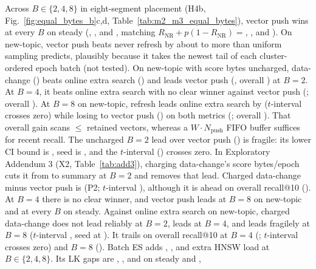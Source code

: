 Across $B \in \{2, 4, 8\}$ in eight-segment placement (H4b, Fig.~\ref{fig:equal_bytes_b}c,d, Table~\ref{tab:m2_m3_equal_bytes}), vector push wins at every $B$ on steady (\RNumMThreePVRecentBTwoSteady{}, \RNumMThreePVRecentBFourSteady{}, and \RNumMThreePVRecentBEightSteady{}, matching $R_{\text{NR}} + p(1 - R_{\text{NR}}) = {}$\RNumMThreePVPredRecentBTwoSteady{}, \RNumMThreePVPredRecentBFourSteady{}, and \RNumMThreePVPredRecentBEightSteady{}). On new-topic, vector push beats never refresh by about \RNumMThreePVNewTopicExcessMin{} to \RNumMThreePVNewTopicExcessMax{} more than uniform sampling predicts, plausibly because it takes the newest tail of each cluster-ordered epoch batch (not tested). On new-topic with score bytes uncharged, data-change (\RNumMThreeDCRecentBTwoNewTopic{}) beats online extra search (\RNumMThreeESORecentBTwoNewTopic{}) and leads vector push (\RNumMThreePVRecentBTwoNewTopic{}, overall \RNumHFourBRefMinusPVOverallBTwoNewTopic{}) at $B = 2$. At $B = 4$, it beats online extra search with no clear winner against vector push (\RNumHFourBRefMinusPVBFourNewTopic{}; overall \RNumHFourBRefMinusPVOverallBFourNewTopic{}). At $B = 8$ on new-topic, refresh leads online extra search by \RNumHFourBRefMinusESOBEightNewTopic{} ($t$-interval \RNumHFourBRefMinusESOBEightNewTopicTInt{} crosses zero) while losing to vector push (\RNumMThreePVRecentBEightNewTopic{}) on both metrics (\RNumHFourBRefMinusPVBEightNewTopic{}; overall \RNumHFourBRefMinusPVOverallBEightNewTopic{}). That overall gain scans $\le {}$\RNumPVMaxVecsBEight{} retained vectors, whereas a $W \cdot N_{\text{push}}$ FIFO buffer suffices for recent recall. The uncharged $B = 2$ lead over vector push (\RNumHFourBRefMinusPVBTwoNewTopic{}) is fragile: its lower CI bound is \RNumHFourBRefMinusPVBTwoNewTopicLow{}, seed \RNumHFourBDCMinusPVBTwoNewTopicNegSeed{} is \RNumHFourBDCMinusPVBTwoNewTopicNegSeedGap{}, and the $t$-interval (\RNumHFourBDCMinusPVBTwoNewTopicTInt{}) crosses zero. In Exploratory Addendum 3 (X2, Table~\ref{tab:add3}), charging data-change's \RNumDCScoreEpochBytes{} score bytes/epoch cuts it from \RNumFourRulesSummariesBTwo{} to \RNumOneSummary{} summary at $B = 2$ and removes that lead. Charged data-change minus vector push is \RNumAddThreeXTwoPVBTwoNewTopic{} (P2; $t$-interval \RNumAddThreeXTwoPVBTwoNewTopicTInt{}), although it is ahead on overall recall@10 (\RNumAddThreeXTwoPVOverallBTwoNewTopic{}). At $B = 4$ there is no clear winner, and vector push leads at $B = 8$ on new-topic and at every $B$ on steady. Against online extra search on new-topic, charged data-change does not lead reliably at $B{=}2$, leads at $B{=}4$, and leads fragilely at $B{=}8$ ($t$-interval \RNumAddThreeXTwoESOBEightNewTopicTInt{}, seed \RNumAddThreeXTwoESOBEightNewTopicNegSeed{} at \RNumAddThreeXTwoESOBEightNewTopicNegSeedGap{}). It trails on overall recall@10 at $B{=}4$ (\RNumAddThreeXTwoESOOverallBFourNewTopic{}; $t$-interval crosses zero) and $B{=}8$ (\RNumAddThreeXTwoESOOverallBEightNewTopic{}). Batch ES adds \RNumESLoadPctBTwo{}, \RNumESLoadPctBFour{}, and \RNumESLoadPctBEight{} extra HNSW load at $B \in \{2, 4, 8\}$. Its LK gaps are \RNumLookaheadMThreeBTwoSteady{}, \RNumLookaheadMThreeBFourSteady{}, and \RNumLookaheadMThreeBEightSteady{} on steady and \RNumLookaheadMThreeBTwoNewTopic{}, 